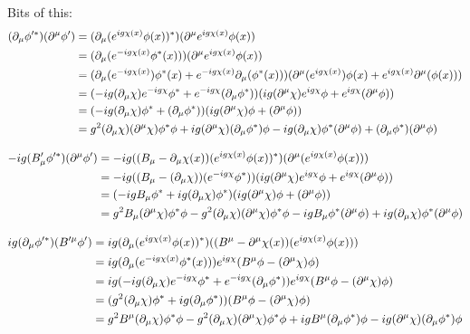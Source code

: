 \newpage
Bits of this:
\begin{align*}
    (\partial_\mu\phi'^*)(\partial^\mu\phi') &= (\partial_\mu(e^{ig\chi(x)}\phi(x))^*)(\partial^\mu e^{ig\chi(x)}\phi(x))\\
    &= (\partial_\mu(e^{-ig\chi(x)}\phi^*(x)))(\partial^\mu e^{ig\chi(x)}\phi(x)) \\
    &= (\partial_\mu(e^{-ig\chi(x)})\phi^*(x) + e^{-ig\chi(x)}\partial_\mu(\phi^*(x)))(\partial^\mu (e^{ig\chi(x)})\phi(x) + e^{ig\chi(x)}\partial^\mu (\phi(x))) \\
    &= (-ig(\partial_\mu\chi)e^{-ig\chi}\phi^* + e^{-ig\chi}(\partial_\mu \phi^*))(ig(\partial^\mu \chi) e^{ig\chi}\phi + e^{ig\chi} (\partial^\mu \phi)) \\
    &= (-ig(\partial_\mu\chi)\phi^* + (\partial_\mu \phi^*))(ig(\partial^\mu \chi) \phi + (\partial^\mu \phi)) \\
    &= g^2(\partial_\mu\chi)(\partial^\mu \chi) \phi^* \phi + ig(\partial^\mu \chi)(\partial_\mu \phi^*) \phi -ig(\partial_\mu\chi)\phi^*(\partial^\mu \phi) +(\partial_\mu \phi^*)(\partial^\mu \phi) \\
\end{align*}

\begin{align*}
    - ig (B_\mu'\phi'^*) (\partial^\mu\phi') &= - ig ((B_\mu - \partial_\mu \chi(x))(e^{ig\chi(x)}\phi(x))^*) (\partial^\mu(e^{ig\chi(x)}\phi(x))) \\
    &= - ig ((B_\mu - (\partial_\mu \chi))(e^{-ig\chi}\phi^*)) (ig(\partial^\mu \chi)e^{ig\chi}\phi + e^{ig\chi}(\partial^\mu\phi)) \\
    &=  (- ig B_\mu \phi^* + ig(\partial_\mu \chi)\phi^*) (ig(\partial^\mu \chi)\phi + (\partial^\mu\phi)) \\
    &= g^2 B_\mu (\partial^\mu \chi)\phi^*\phi - g^2(\partial_\mu \chi)(\partial^\mu \chi)\phi^*\phi - ig B_\mu \phi^*(\partial^\mu\phi) + ig(\partial_\mu \chi)\phi^*(\partial^\mu\phi) \\
\end{align*}

\begin{align*}
    ig(\partial_\mu\phi'^*)(B'^\mu\phi') &= ig(\partial_\mu(e^{ig\chi(x)}\phi(x))^*)((B^\mu - \partial^\mu \chi(x))(e^{ig\chi(x)}\phi(x))) \\
    &= ig(\partial_\mu(e^{-ig\chi(x)}\phi^*(x)))e^{ig\chi}(B^\mu \phi - (\partial^\mu \chi)\phi) \\
    &= ig(-ig(\partial_\mu \chi)e^{-ig\chi}\phi^* + e^{-ig\chi}(\partial_\mu \phi^*))e^{ig\chi}(B^\mu \phi - (\partial^\mu \chi)\phi) \\
    &= (g^2(\partial_\mu \chi)\phi^* + ig(\partial_\mu \phi^*))(B^\mu \phi - (\partial^\mu \chi)\phi) \\
    &= g^2B^\mu(\partial_\mu \chi)\phi^*\phi - g^2(\partial_\mu \chi)(\partial^\mu \chi)\phi^*\phi + igB^\mu(\partial_\mu \phi^*)\phi - ig(\partial^\mu \chi)(\partial_\mu \phi^*)\phi \\
\end{align*}

